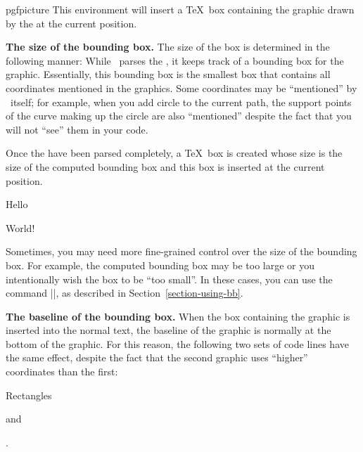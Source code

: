 \begin{environment}{{pgfpicture}}
    This environment will insert a \TeX\ box containing the graphic drawn by
    the  at the current position.


    \medskip
    \textbf{The size of the bounding box.}
    The size of the box is determined in the following manner: While \pgfname\
    parses the , it keeps track of a bounding box
    for the graphic. Essentially, this bounding box is the smallest box that
    contains all coordinates mentioned in the graphics. Some coordinates may be
    ``mentioned'' by \pgfname\ itself; for example, when you add circle to the
    current path, the support points of the curve making up the circle are also
    ``mentioned'' despite the fact that you will not ``see'' them in your code.

    Once the  have been parsed completely, a \TeX\
    box is created whose size is the size of the computed bounding box and this
    box is inserted at the current position.
\begin{codeexample}[]
Hello \begin{pgfpicture}
  \pgfpathrectangle{\pgfpointorigin}{\pgfpoint{2ex}{1ex}}
  \pgfusepath{stroke}
\end{pgfpicture} World!
\end{codeexample}

    Sometimes, you may need more fine-grained control over the size of the
    bounding box. For example, the computed bounding box may be too large or
    you intentionally wish the box to be ``too small''. In these cases, you can
    use the command |\pgfusepath{use as bounding box}|, as described in
    Section~\ref{section-using-bb}.


    \medskip
    \textbf{The baseline of the bounding box.}
    When the box containing the graphic is inserted into the normal text, the
    baseline of the graphic is normally at the bottom of the graphic. For this
    reason, the following two sets of code lines have the same effect, despite
    the fact that the second graphic uses ``higher'' coordinates than the
    first:
\begin{codeexample}[]
Rectangles \begin{pgfpicture}
  \pgfpathrectangle{\pgfpointorigin}{\pgfpoint{2ex}{1ex}}
\end{pgfpicture} and \begin{pgfpicture}
  \pgfpathrectangle{\pgfpoint{0ex}{1ex}}{\pgfpoint{2ex}{1ex}}
  \pgfusepath{stroke}
\end{pgfpicture}.
\end{codeexample}


\end{environment}

